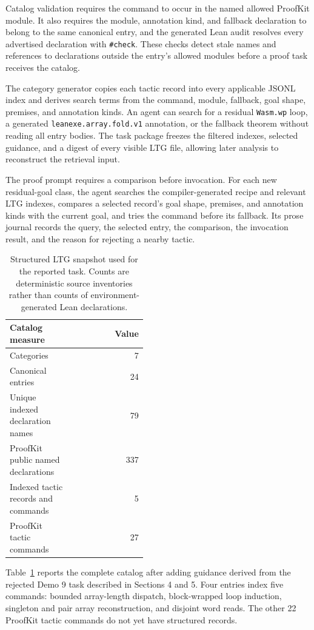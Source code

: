\documentclass[10pt]{article}
\newcommand{\code}[1]{\texttt{#1}}
\begin{document}
Catalog validation requires the command to occur in the named allowed ProofKit module.  It also requires the module, annotation kind, and fallback declaration to belong to the same canonical entry, and the generated Lean audit resolves every advertised declaration with \code{\#check}.  These checks detect stale names and references to declarations outside the entry's allowed modules before a proof task receives the catalog.

The category generator copies each tactic record into every applicable JSONL index and derives search terms from the command, module, fallback, goal shape, premises, and annotation kinds.  An agent can search for a residual \code{Wasm.wp} loop, a generated \code{leanexe.array.fold.v1} annotation, or the fallback theorem without reading all entry bodies.  The task package freezes the filtered indexes, selected guidance, and a digest of every visible LTG file, allowing later analysis to reconstruct the retrieval input.

The proof prompt requires a comparison before invocation.  For each new residual-goal class, the agent searches the compiler-generated recipe and relevant LTG indexes, compares a selected record's goal shape, premises, and annotation kinds with the current goal, and tries the command before its fallback.  Its prose journal records the query, the selected entry, the comparison, the invocation result, and the reason for rejecting a nearby tactic.

\begin{table}[t]
\centering
\small
\begin{tabular}{>{\raggedright\arraybackslash}p{0.45\linewidth} r}
\toprule
Catalog measure & Value \\
\midrule
Categories & 7 \\
Canonical entries & 24 \\
Unique indexed declaration names & 79 \\
ProofKit public named declarations & 337 \\
Indexed tactic records and commands & 5 \\
ProofKit tactic commands & 27 \\
\bottomrule
\end{tabular}
\caption{Structured LTG snapshot used for the reported task.  Counts are deterministic source inventories rather than counts of environment-generated Lean declarations.}
\label{tab:inventory}
\end{table}

Table~\ref{tab:inventory} reports the complete catalog after adding guidance derived from the rejected Demo 9 task described in Sections 4 and 5.  Four entries index five commands: bounded array-length dispatch, block-wrapped loop induction, singleton and pair array reconstruction, and disjoint word reads.  The other 22 ProofKit tactic commands do not yet have structured records.
\end{document}
